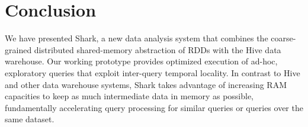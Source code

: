 
\section{Conclusion}

We have presented Shark, a new data analysis system that combines the coarse-grained distributed shared-memory abstraction of RDDs with the Hive data warehouse. Our working prototype provides optimized execution of ad-hoc, exploratory queries that exploit inter-query temporal locality. In contrast to Hive and other data warehouse systems, Shark takes advantage of increasing RAM capacities to keep as much intermediate data in memory as possible, fundamentally accelerating query processing for similar queries or queries over the same dataset. 
